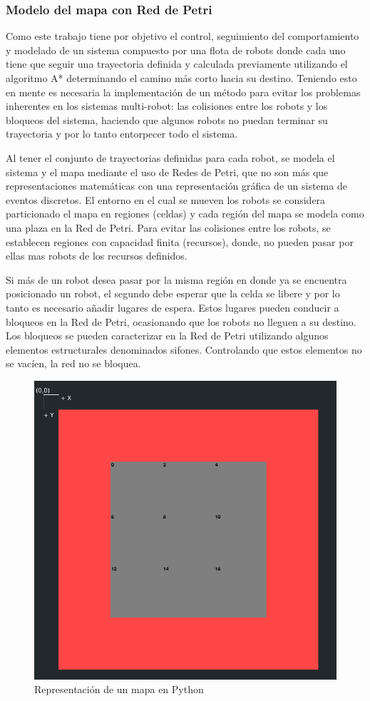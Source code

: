 \subsubsection{Modelo del mapa con Red de Petri} \mbox{} \vspace{10pt}

Como este trabajo tiene por objetivo el control, seguimiento del comportamiento y modelado de un sistema compuesto por una flota de robots donde cada uno tiene que seguir una trayectoria definida y calculada previamente utilizando el algoritmo A* determinando el camino más corto hacia su destino. Teniendo esto en mente es necesaria la implementación de un método para evitar los problemas inherentes en los sistemas multi-robot: las colisiones entre los robots y los bloqueos del sistema, haciendo que algunos robots no puedan terminar su trayectoria y por lo tanto entorpecer todo el sistema.

Al tener el conjunto de trayectorias definidas para cada robot, se modela el sistema y el mapa mediante el uso de Redes de Petri, que no son más que representaciones matemáticas con una representación gráfica de un sistema de eventos discretos. El entorno en el cual se mueven los robots se considera particionado el mapa en regiones (celdas) y cada región del mapa se modela como una plaza en la Red de Petri. Para evitar las colisiones entre los robots, se establecen regiones con capacidad finita (recursos), donde, no pueden pasar por ellas mas robots de los recursos definidos.

Si más de un robot desea pasar por la misma región en donde ya se encuentra posicionado un robot, el segundo debe esperar que la celda se libere y por lo tanto es necesario añadir lugares de espera. Estos lugares pueden conducir a bloqueos en la Red de Petri, ocasionando que los robots no lleguen a su destino. Los bloqueos se pueden caracterizar en la Red de Petri utilizando algunos elementos estructurales denominados sifones. Controlando que estos elementos no se vacíen, la red no se bloquea.

\begin{figure}[H]
   \centering
   \includegraphics[width=0.6\linewidth]{images/mapa_py.png}
   \caption{Representación de un mapa en Python}
   \label{fig:mapa_py}
\end{figure}

